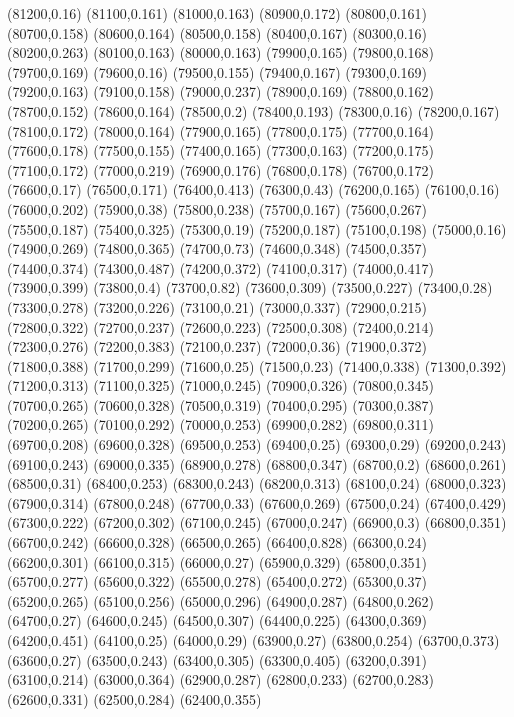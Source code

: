 (81200,0.16)
(81100,0.161)
(81000,0.163)
(80900,0.172)
(80800,0.161)
(80700,0.158)
(80600,0.164)
(80500,0.158)
(80400,0.167)
(80300,0.16)
(80200,0.263)
(80100,0.163)
(80000,0.163)
(79900,0.165)
(79800,0.168)
(79700,0.169)
(79600,0.16)
(79500,0.155)
(79400,0.167)
(79300,0.169)
(79200,0.163)
(79100,0.158)
(79000,0.237)
(78900,0.169)
(78800,0.162)
(78700,0.152)
(78600,0.164)
(78500,0.2)
(78400,0.193)
(78300,0.16)
(78200,0.167)
(78100,0.172)
(78000,0.164)
(77900,0.165)
(77800,0.175)
(77700,0.164)
(77600,0.178)
(77500,0.155)
(77400,0.165)
(77300,0.163)
(77200,0.175)
(77100,0.172)
(77000,0.219)
(76900,0.176)
(76800,0.178)
(76700,0.172)
(76600,0.17)
(76500,0.171)
(76400,0.413)
(76300,0.43)
(76200,0.165)
(76100,0.16)
(76000,0.202)
(75900,0.38)
(75800,0.238)
(75700,0.167)
(75600,0.267)
(75500,0.187)
(75400,0.325)
(75300,0.19)
(75200,0.187)
(75100,0.198)
(75000,0.16)
(74900,0.269)
(74800,0.365)
(74700,0.73)
(74600,0.348)
(74500,0.357)
(74400,0.374)
(74300,0.487)
(74200,0.372)
(74100,0.317)
(74000,0.417)
(73900,0.399)
(73800,0.4)
(73700,0.82)
(73600,0.309)
(73500,0.227)
(73400,0.28)
(73300,0.278)
(73200,0.226)
(73100,0.21)
(73000,0.337)
(72900,0.215)
(72800,0.322)
(72700,0.237)
(72600,0.223)
(72500,0.308)
(72400,0.214)
(72300,0.276)
(72200,0.383)
(72100,0.237)
(72000,0.36)
(71900,0.372)
(71800,0.388)
(71700,0.299)
(71600,0.25)
(71500,0.23)
(71400,0.338)
(71300,0.392)
(71200,0.313)
(71100,0.325)
(71000,0.245)
(70900,0.326)
(70800,0.345)
(70700,0.265)
(70600,0.328)
(70500,0.319)
(70400,0.295)
(70300,0.387)
(70200,0.265)
(70100,0.292)
(70000,0.253)
(69900,0.282)
(69800,0.311)
(69700,0.208)
(69600,0.328)
(69500,0.253)
(69400,0.25)
(69300,0.29)
(69200,0.243)
(69100,0.243)
(69000,0.335)
(68900,0.278)
(68800,0.347)
(68700,0.2)
(68600,0.261)
(68500,0.31)
(68400,0.253)
(68300,0.243)
(68200,0.313)
(68100,0.24)
(68000,0.323)
(67900,0.314)
(67800,0.248)
(67700,0.33)
(67600,0.269)
(67500,0.24)
(67400,0.429)
(67300,0.222)
(67200,0.302)
(67100,0.245)
(67000,0.247)
(66900,0.3)
(66800,0.351)
(66700,0.242)
(66600,0.328)
(66500,0.265)
(66400,0.828)
(66300,0.24)
(66200,0.301)
(66100,0.315)
(66000,0.27)
(65900,0.329)
(65800,0.351)
(65700,0.277)
(65600,0.322)
(65500,0.278)
(65400,0.272)
(65300,0.37)
(65200,0.265)
(65100,0.256)
(65000,0.296)
(64900,0.287)
(64800,0.262)
(64700,0.27)
(64600,0.245)
(64500,0.307)
(64400,0.225)
(64300,0.369)
(64200,0.451)
(64100,0.25)
(64000,0.29)
(63900,0.27)
(63800,0.254)
(63700,0.373)
(63600,0.27)
(63500,0.243)
(63400,0.305)
(63300,0.405)
(63200,0.391)
(63100,0.214)
(63000,0.364)
(62900,0.287)
(62800,0.233)
(62700,0.283)
(62600,0.331)
(62500,0.284)
(62400,0.355)
